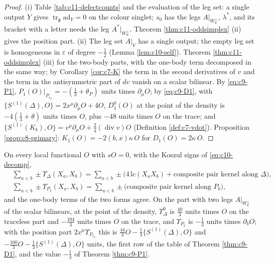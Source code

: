 \begin{proof}
(i) Table \ref{tab:c11-defectcounts} and the evaluation of the leg set: a single output $Y$ gives $\operatorname{tr}_{\mathfrak g}\mathrm{ad}_Y=0$ on the colour singlet; $s_0$ has the legs $A|_{W_{\mathbb R}^\perp}$, $\lambda^*$, and its bracket with a letter needs the leg $A^*|_{W_{\mathbb R}^\perp}$. Theorem \ref{thm:c11-oddsimplex} (ii) gives the position part. (ii) The leg set $A|_V$ has a single output; the empty leg set is homogeneous in $\varepsilon$ of degree $-\tfrac12$ (Lemma \ref{lem:c10-self}). Theorem \ref{thm:c11-oddsimplex} (iii) for the two-body parts, with the one-body term decomposed in the same way; by Corollary \ref{cor:c7-K} the term in the second derivatives of $v$ and the term in the antisymmetric part of $dv$ vanish on a scalar bilinear. By \eqref{eq:c9-P1}, $P_1(O)|_{P_{e_\mu}}=-(\tfrac13+\theta_P)$ units times $\partial_\mu O$; by \eqref{eq:c9-D1}, with $\{S^{(1)}(\Delta),O\}=2x^\mu\partial_\mu O+4O$, $D^0_1(O)$ at the point of the density is $-4(\tfrac13+\theta)$ units times $O$, plus $-48$ units times $O$ on the trace; and $\{S^{(1)}(K_b),O\}=v^\mu\partial_\mu O+\tfrac24(\operatorname{div}v)O$ (Definition \ref{def:c7-vdot}). Proposition \ref{prop:c8-primary}: $K_1(O)=-2(b,x)\kappa\,O$ for $D_1(O)=2\kappa\,O$.
\end{proof}

\begin{corollary}
\label{cor:c11-DPdefect}
On every local functional $O$ with $sO=0$, with the Koszul signs of \eqref{eq:c10-decomp},
\[
\begin{aligned}
&\sum_{a<b}\pm\Upsilon_\Delta(X_a,X_b)=\sum_{a<b}\pm\big(4\,\mathrm{lc}(X_aX_b)+\text{composite pair kernel along }\Delta\big),\\
&\sum_{a<b}\pm\Upsilon_{P_b}(X_a,X_b)=\sum_{a<b}\pm\big(\text{composite pair kernel along }P_b\big),
\end{aligned}
\]
and the one-body terms of the two forms agree. On the part with two legs $A|_{W_{\mathbb R}^\perp}$ of the scalar bilinears, at the point of the density, $\Upsilon^0_\Delta$ is $\tfrac{40}3$ units times $O$ on the traceless part and $-\tfrac{104}3$ units times $O$ on the trace, and $\Upsilon_{P_b}$ is $-\tfrac13$ units times $\partial_bO$; with the position part $2x^\mu\Upsilon_{P_{e_\mu}}$ this is $\tfrac{44}3O-\tfrac13\{S^{(1)}(\Delta),O\}$ and $-\tfrac{100}3O-\tfrac13\{S^{(1)}(\Delta),O\}$ units, the first row of the table of Theorem \ref{thm:c9-D1}, and the value $-\tfrac13$ of Theorem \ref{thm:c9-P1}.
\end{corollary}

